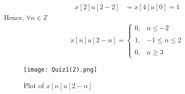 \documentclass[journal,12pt,twocolumn]{IEEEtran}
\begin{document}
\begin{enumerate}
\begin{align}
    x[2]u[2-2]&=x[4]u[0]=1
\end{align}
Hence, $\forall n \in \mathbb{Z}$
\begin{align}
    x[n]u[2-n]=\begin{cases}
	0, & n \leq -2 \\~\\[-1em]
	1, & -1 \leq n \leq 2 \\~\\[-1em]
	0, & n \geq 3
	\end{cases}
	\label{eq:z}
\end{align}
\begin{figure}[!h]
 \centering
 \texttt{[image: Quiz1(2).png]}
 \caption{Plot of $x[n]u[2-n]$}
 \label{plot}
\end{figure}
\end{enumerate}
\end{document}
